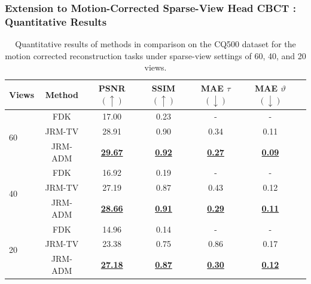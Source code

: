 \begin{frame}[fragile]
        \frametitle{Extension to Motion-Corrected Sparse-View Head CBCT \cite{de2025adaptive}: Quantitative Results}

        \begin{table}[t]
                \scriptsize
                \centering
                \begin{tabular}{lcccccc}
                        \toprule
                        Views & Method  & PSNR $(\uparrow)$          & SSIM $(\uparrow)$         & MAE $\tau$ $(\downarrow)$ & MAE $\vartheta$ $(\downarrow)$ \\
                        \midrule
                        \multirow{3}{*}{60}
                              & FDK     & 17.00                      & 0.23                      & -                         & -                              \\
                              & JRM-TV  & 28.91                      & 0.90                      & 0.34                      & 0.11                           \\
                              & JRM-ADM & \underline{\textbf{29.67}} & \underline{\textbf{0.92}} & \underline{\textbf{0.27}} & \underline{\textbf{0.09}}      \\
                        \midrule
                        \multirow{3}{*}{40}
                              & FDK     & 16.92                      & 0.19                      & -                         & -                              \\
                              & JRM-TV  & 27.19                      & 0.87                      & 0.43                      & 0.12                           \\
                              & JRM-ADM & \underline{\textbf{28.66}} & \underline{\textbf{0.91}} & \underline{\textbf{0.29}} & \underline{\textbf{0.11}}      \\
                        \midrule
                        \multirow{3}{*}{20}
                              & FDK     & 14.96                      & 0.14                      & -                         & -                              \\
                              & JRM-TV  & 23.38                      & 0.75                      & 0.86                      & 0.17                           \\
                              & JRM-ADM & \underline{\textbf{27.18}} & \underline{\textbf{0.87}} & \underline{\textbf{0.30}} & \underline{\textbf{0.12}}      \\
                        \bottomrule
                \end{tabular}
                \caption{Quantitative results of methods in comparison on the CQ500 \cite{chilamkurthy2018deep} dataset for the motion corrected reconstruction tasks under sparse-view settings of 60, 40, and 20 views.}
        \end{table}
\end{frame}




